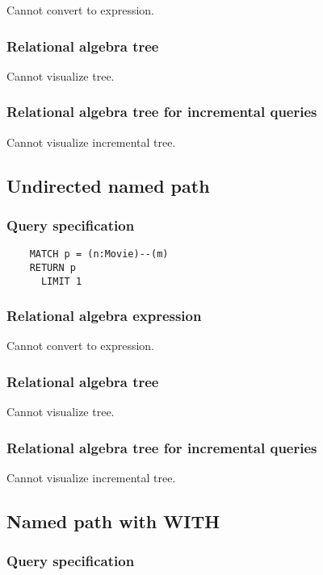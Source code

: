	Cannot convert to expression.

	\subsubsection*{Relational algebra tree}

	Cannot visualize tree.

	\subsubsection*{Relational algebra tree for incremental queries}

	Cannot visualize incremental tree.
	\subsection{Undirected named path}

	\subsubsection*{Query specification}

	\begin{lstlisting}
	MATCH p = (n:Movie)--(m)
	RETURN p
	  LIMIT 1
	\end{lstlisting}


	\subsubsection*{Relational algebra expression}

	Cannot convert to expression.

	\subsubsection*{Relational algebra tree}

	Cannot visualize tree.

	\subsubsection*{Relational algebra tree for incremental queries}

	Cannot visualize incremental tree.
	\subsection{Named path with WITH}

	\subsubsection*{Query specification}


